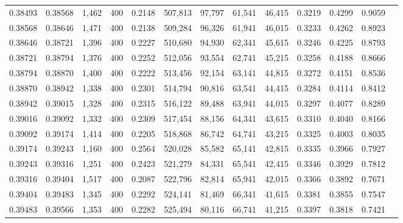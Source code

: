 \begin{tabular}{rrrrrrrrrrrrr}
0.38493 & 0.38568 &  1,462 & 400 &                                     0.2148 & 507,813 &  97,797 &  61,541 &  46,415 & 0.3219 & 0.4299 & 0.9059 \\
0.38568 & 0.38646 &  1,471 & 400 &                                     0.2138 & 509,284 &  96,326 &  61,941 &  46,015 & 0.3233 & 0.4262 & 0.8923 \\
0.38646 & 0.38721 &  1,396 & 400 &                                     0.2227 & 510,680 &  94,930 &  62,341 &  45,615 & 0.3246 & 0.4225 & 0.8793 \\
0.38721 & 0.38794 &  1,376 & 400 &                                     0.2252 & 512,056 &  93,554 &  62,741 &  45,215 & 0.3258 & 0.4188 & 0.8666 \\
0.38794 & 0.38870 &  1,400 & 400 &                                     0.2222 & 513,456 &  92,154 &  63,141 &  44,815 & 0.3272 & 0.4151 & 0.8536 \\
0.38870 & 0.38942 &  1,338 & 400 &                                     0.2301 & 514,794 &  90,816 &  63,541 &  44,415 & 0.3284 & 0.4114 & 0.8412 \\
0.38942 & 0.39015 &  1,328 & 400 &                                     0.2315 & 516,122 &  89,488 &  63,941 &  44,015 & 0.3297 & 0.4077 & 0.8289 \\
0.39016 & 0.39092 &  1,332 & 400 &                                     0.2309 & 517,454 &  88,156 &  64,341 &  43,615 & 0.3310 & 0.4040 & 0.8166 \\
0.39092 & 0.39174 &  1,414 & 400 &                                     0.2205 & 518,868 &  86,742 &  64,741 &  43,215 & 0.3325 & 0.4003 & 0.8035 \\
0.39174 & 0.39243 &  1,160 & 400 &                                     0.2564 & 520,028 &  85,582 &  65,141 &  42,815 & 0.3335 & 0.3966 & 0.7927 \\
0.39243 & 0.39316 &  1,251 & 400 &                                     0.2423 & 521,279 &  84,331 &  65,541 &  42,415 & 0.3346 & 0.3929 & 0.7812 \\
0.39316 & 0.39404 &  1,517 & 400 &                                     0.2087 & 522,796 &  82,814 &  65,941 &  42,015 & 0.3366 & 0.3892 & 0.7671 \\
0.39404 & 0.39483 &  1,345 & 400 &                                     0.2292 & 524,141 &  81,469 &  66,341 &  41,615 & 0.3381 & 0.3855 & 0.7547 \\
0.39483 & 0.39566 &  1,353 & 400 &                                     0.2282 & 525,494 &  80,116 &  66,741 &  41,215 & 0.3397 & 0.3818 & 0.7421 \\

\end{tabular}

